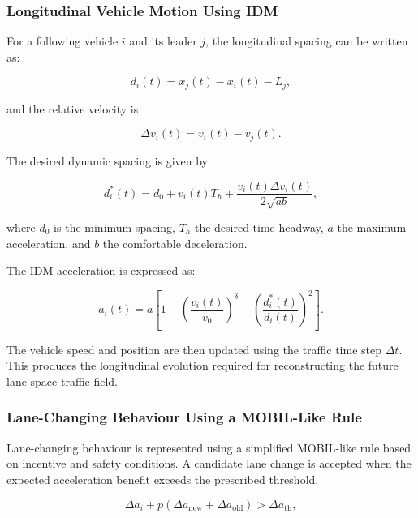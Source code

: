 \documentclass[journal]{IEEEtran}
\begin{document}
\subsubsection{Longitudinal Vehicle Motion Using IDM}

For a following vehicle $i$ and its leader $j$, the longitudinal spacing can be written as:

\begin{equation}
d_i(t)
=
x_j(t)-x_i(t)-L_j,
\end{equation}

and the relative velocity is

\begin{equation}
\Delta v_i(t)
=
v_i(t)-v_j(t).
\end{equation}

The desired dynamic spacing is given by

\begin{equation}
d_i^{*}(t)
=
d_0
+
v_i(t)T_h
+
\frac{
v_i(t)\Delta v_i(t)
}{
2\sqrt{ab}
},
\end{equation}

where $d_0$ is the minimum spacing, $T_h$ the desired time headway, $a$ the maximum acceleration, and $b$ the comfortable deceleration.

The IDM acceleration is expressed as:

\begin{equation}
a_i(t)
=
a
\left[
1
-
\left(
\frac{v_i(t)}{v_0}
\right)^{\delta}
-
\left(
\frac{d_i^{*}(t)}{d_i(t)}
\right)^2
\right].
\end{equation}

The vehicle speed and position are then updated using the traffic time step $\Delta t$. This produces the longitudinal evolution required for reconstructing the future lane-space traffic field.


\subsubsection{Lane-Changing Behaviour Using a MOBIL-Like Rule}

Lane-changing behaviour is represented using a simplified MOBIL-like rule based on incentive and safety conditions. A candidate lane change is accepted when the expected acceleration benefit exceeds the prescribed threshold,

\begin{equation}
\Delta a_i
+
p
\left(
\Delta a_{\mathrm{new}}
+
\Delta a_{\mathrm{old}}
\right)
>
\Delta a_{\mathrm{th}},
\end{equation}
\end{document}
